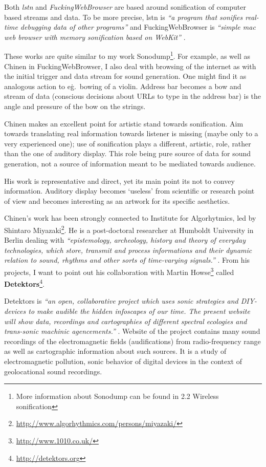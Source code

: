 \documentclass[12pt,a4paper,oneside]{report}
\begin{document}
Both \emph{lstn} and \emph{FuckingWebBrowser} are based around sonification of computer based streams and data. To be more precise, lstn is \emph{``a program that sonifies real-time debugging data of other programs''} and FuckingWebBrowser is \emph{``simple mac web browser with memory sonification based on WebKit''} \cite{Chinen2010, Chinen2010a}.

These works are quite similar to my work Sonodump\footnote{More information about Sonodump can be found in 2.2 Wireless sonification}. For example, as well as Chinen in FuckingWebBrowser, I also deal with browsing of the internet as with the initial trigger and data stream for sound generation. One might find it as analogous action to e\.g.\, bowing of a violin. Address bar becomes a bow and stream of data (conscious decisions about URLs to type in the address bar) is the angle and pressure of the bow on the strings. 

Chinen makes an excellent point for artistic stand towards sonification. Aim towards translating real information towards listener is missing (maybe only to a very experienced one); use of sonification plays a different, artistic, role, rather than the one of auditory display. This role being pure source of data for sound generation, not a source of information meant to be mediated towards audience.

His work is representative and direct, yet its main point its not to convey information. Auditory display becomes `useless' from scientific or research point of view and becomes interesting as an artwork for its specific aesthetics.

Chinen's work has been strongly connected to Institute for Algorhytmics, led by Shintaro Miyazaki\footnote{\url{http://www.algorhythmics.com/persons/miyazaki/}}. He is a post-doctoral researcher at Humboldt University in Berlin dealing with \emph{``epistemology, archeology, history and theory of everyday technologies, which store, transmit and process informations and their dynamic relation to sound, rhythms and other sorts of time-varying signals.''} \cite{Miyazaki2012}. From his projects, I want to point out his collaboration with Martin Howse\footnote{\url{http://www.1010.co.uk/}} called \textbf{Detektors}\footnote{\url{http://detektors.org}}.

Detektors is \emph{``an open, collaborative project which uses sonic strategies and DIY-devices to make audible the hidden infoscapes of our time. The present website will show data, recordings and cartographies of different spectral ecologies and trans-sonic machinic agencements.''} \cite{detektors}. Website of the project contains many sound recordings of the electromagnetic fields (audifications) from radio-frequency range as well as cartographic information about such sources. It is a study of electromagnetic pollution, sonic behavior of digital devices in the context of geolocational sound recordings.
\end{document}
